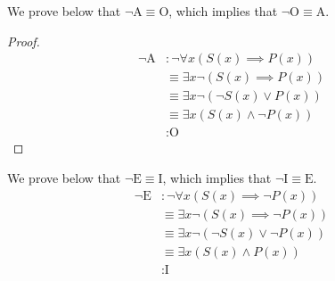 \documentclass[a4paper]{exam}
\begin{document}
\begin{questions}
\begin{parts}
\begin{solution}
    We prove below that $\neg\text{A}\equiv \text{O}$, which implies that $\neg\text{O}\equiv \text{A}$.
    \begin{proof}
    \begin{align*}
      \neg\text{A} &: \neg \forall x (S(x) \implies P(x)) \\
                   &\equiv \exists x \neg(S(x) \implies P(x)) \\
                   &\equiv \exists x \neg(\neg S(x) \lor P(x)) \\
                   &\equiv \exists x (S(x) \land \neg P(x)) \\
                   &: \text{O}
    \end{align*}
  \end{proof}
  We prove below that $\neg\text{E}\equiv \text{I}$, which implies that $\neg\text{I}\equiv \text{E}$.
  \begin{align*}
      \neg\text{E} &: \neg \forall x (S(x) \implies \neg P(x)) \\
                   &\equiv \exists x \neg(S(x) \implies \neg P(x)) \\
                   &\equiv \exists x \neg(\neg S(x) \lor \neg P(x)) \\
                   &\equiv \exists x (S(x) \land P(x)) \\
                   &: \text{I}
    \end{align*}
  \end{solution}
  \end{parts}
  
\end{questions}
\end{document}
